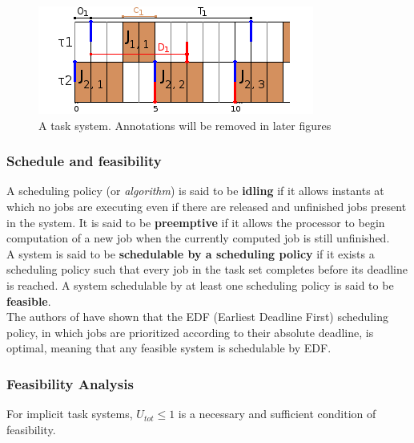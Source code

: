 \documentclass[a4paper,10pt]{article}
\begin{document}
        \begin{figure}[H]
        \begin{center}
            \includegraphics{figs/RTsystem_example.png}
            \caption{A task system. Annotations will be removed in later figures}
            \label{fig:rt_ex}
        \end{center}
        \end{figure}


        \subsubsection{Schedule and feasibility}

        A scheduling policy (or \emph{algorithm}) is said to be \textbf{idling} if it allows instants at which no jobs are executing even if there are released and unfinished jobs present in the system. It is said to be \textbf{preemptive} if it allows the processor to begin computation of a new job when the currently computed job is still unfinished.\\

        A system is said to be \textbf{schedulable by a scheduling policy} if it exists a scheduling policy such that every job in the task set completes before its deadline is reached. A system schedulable by at least one scheduling policy is said to be \textbf{feasible}.\\

        The authors of \cite{liu1973scheduling} have shown that the EDF (Earliest Deadline First) scheduling policy, in which jobs are prioritized according to their absolute deadline, is optimal, meaning that any feasible system is schedulable by EDF.

        \subsubsection{Feasibility Analysis}

        For implicit task systems, $U_{tot} \leqslant 1$ is a necessary and sufficient condition of feasibility.\\
\end{document}
